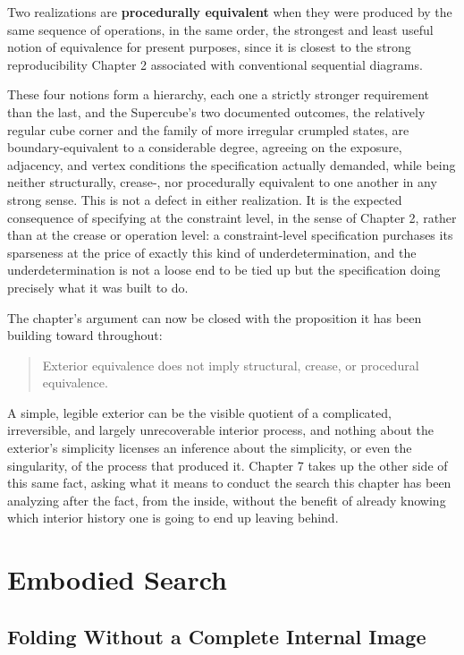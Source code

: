 \documentclass[11pt,oneside]{book}
\begin{document}
Two realizations are \textbf{procedurally equivalent} when they were
produced by the same sequence of operations, in the same order, the
strongest and least useful notion of equivalence for present purposes,
since it is closest to the strong reproducibility Chapter 2 associated
with conventional sequential diagrams.

These four notions form a hierarchy, each one a strictly stronger
requirement than the last, and the Supercube's two documented outcomes,
the relatively regular cube corner and the family of more irregular
crumpled states, are boundary-equivalent to a considerable degree,
agreeing on the exposure, adjacency, and vertex conditions the
specification actually demanded, while being neither structurally,
crease-, nor procedurally equivalent to one another in any strong sense.
This is not a defect in either realization. It is the expected
consequence of specifying at the constraint level, in the sense of
Chapter 2, rather than at the crease or operation level: a
constraint-level specification purchases its sparseness at the price of
exactly this kind of underdetermination, and the underdetermination is
not a loose end to be tied up but the specification doing precisely what
it was built to do.

The chapter's argument can now be closed with the proposition it has
been building toward throughout:

\begin{quote}
Exterior equivalence does not imply structural, crease, or procedural
equivalence.
\end{quote}

A simple, legible exterior can be the visible quotient of a complicated,
irreversible, and largely unrecoverable interior process, and nothing
about the exterior's simplicity licenses an inference about the
simplicity, or even the singularity, of the process that produced it.
Chapter 7 takes up the other side of this same fact, asking what it
means to conduct the search this chapter has been analyzing after the
fact, from the inside, without the benefit of already knowing which
interior history one is going to end up leaving behind.

\part{Embodied Search}

\hypertarget{chapter-7.-folding-without-a-complete-internal-image}{%
\chapter{Folding Without a Complete Internal
Image}\label{chapter-7.-folding-without-a-complete-internal-image}}
\end{document}
